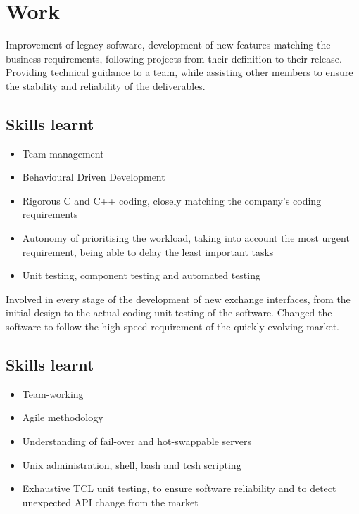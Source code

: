\documentclass{cv}
\begin{document}
\iffalse
\contacten{address line 1}
          {address line 2}
          {address line3}
          {...@.........}
          {+phone~number}
\fi

\section{Work}
{Improvement of legacy software, development of new features matching the business requirements, following projects from their definition to their release. Providing technical guidance to a team, while assisting other members to ensure the stability and reliability of the deliverables.}
\subsection{Skills learnt}
\begin{itemize}
    \item {Team management}
    \item {Behavioural Driven Development}
    \item {Rigorous C and C++ coding, closely matching the company's coding requirements}
    \item {Autonomy of prioritising the workload, taking into account the most urgent requirement, being able to delay the least important tasks}
    \item {Unit testing, component testing and automated testing}
\end{itemize}

{Involved in every stage of the development of new exchange interfaces, from the initial design to the actual coding unit testing of the software.
Changed the software to follow the high-speed requirement of the quickly evolving market.}
\subsection{Skills learnt}
\begin{itemize}
    \item {Team-working}
    \item {Agile methodology}
    \item {Understanding of fail-over and hot-swappable servers}
    \item {Unix administration, shell, bash and tcsh scripting}
    \item {Exhaustive TCL unit testing, to ensure software reliability and to detect unexpected API change from the market}
\end{itemize}
\end{document}

